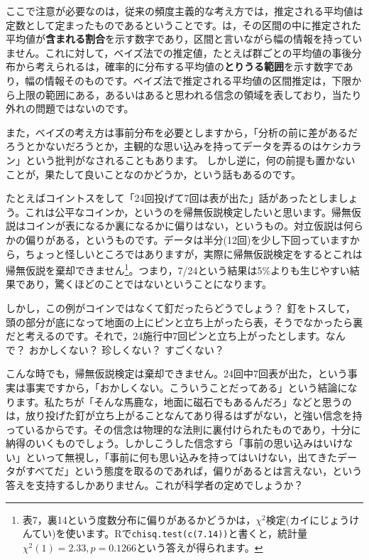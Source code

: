 \documentclass{ltjbook}
\begin{document}
ここで注意が必要なのは，従来の頻度主義的な考え方では，推定される平均値は定数として定まったものであるということです。は，その区間の中に推定された平均値が\textbf{含まれる割合}を示す数字であり，区間と言いながら幅の情報を持っていません。これに対して，ベイズ法での推定値，たとえば群ごとの平均値の事後分布から考えられるは，確率的に分布する平均値の\textbf{とりうる範囲}を示す数字であり，幅の情報そのものです。ベイズ法で推定される平均値の区間推定は，下限から上限の範囲にある，あるいはあると思われる信念の領域を表しており，当たり外れの問題ではないのです。

また，ベイズの考え方は事前分布を必要としますから，「分析の前に差があるだろうとかないだろうとか，主観的な思い込みを持ってデータを弄るのはケシカラン」という批判がなされることもあります。
しかし逆に，何の前提も置かないことが，果たして良いことなのかどうか，という話もあるのです\parencite{Maeda2017}。

たとえばコイントスをして「24回投げて7回は表が出た」話があったとしましょう。これは公平なコインか，というのを帰無仮説検定したいと思います。帰無仮説はコインが表になるか裏になるかに偏りはない，というもの。対立仮説は何らかの偏りがある，というものです。データは半分(12回)を少し下回っていますから，ちょっと怪しいところではありますが，実際に帰無仮説検定をするとこれは帰無仮説を棄却できません\footnote{表7，裏14という度数分布に偏りがあるかどうかは，$\chi^2$検定(カイにじょうけんてい)を使います。Rで\texttt{chisq.test(c(7.14))}と書くと，統計量$\chi^2(1)=2.33,p=0.1266$という答えが得られます。}。つまり，7/24という結果は5\%よりも生じやすい結果であり，驚くほどのことではないということになります。

しかし，この例がコインではなくて釘だったらどうでしょう？ 釘をトスして，頭の部分が底になって地面の上にピンと立ち上がったら表，そうでなかったら裏だと考えるのです。それで，24施行中7回ピンと立ち上がったとします。なんで？ おかしくない？ 珍しくない？ すごくない？

こんな時でも，帰無仮説検定は棄却できません。24回中7回表が出た，という事実は事実ですから，「おかしくない。こういうことだってある」という結論になります。私たちが「そんな馬鹿な，地面に磁石でもあるんだろ」などと思うのは，放り投げた釘が立ち上がることなんてあり得るはずがない，と強い信念を持っているからです。その信念は物理的な法則に裏付けられたものであり，十分に納得のいくものでしょう。しかしこうした信念すら「事前の思い込みはいけない」といって無視し，「事前に何も思い込みを持ってはいけない，出てきたデータがすべてだ」という態度を取るのであれば，偏りがあるとは言えない，という答えを支持するしかありません。これが科学者の定めでしょうか？
\end{document}
